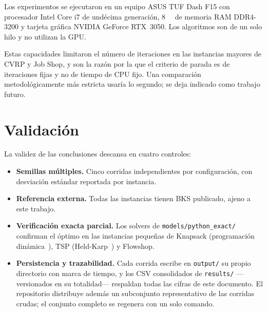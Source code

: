 Los experimentos se ejecutaron en un equipo ASUS TUF Dash F15 con procesador
Intel Core i7 de undécima generación, \SI{8}{\giga\byte} de memoria RAM
DDR4-3200 y tarjeta gráfica NVIDIA GeForce RTX~3050. Los algoritmos son de
un solo hilo y no utilizan la GPU.

Estas capacidades limitaron el número de iteraciones en las instancias
mayores de CVRP y Job Shop, y son la razón por la que el criterio de parada
es de iteraciones fijas y no de tiempo de CPU fijo. Una comparación
metodológicamente más estricta usaría lo segundo; se deja indicado como
trabajo futuro.

\section{Validación}

La validez de las conclusiones descansa en cuatro controles:

\begin{itemize}
  \item \textbf{Semillas múltiples.} Cinco corridas independientes por
    configuración, con desviación estándar reportada por instancia.
  \item \textbf{Referencia externa.} Todas las instancias tienen BKS
    publicado, ajeno a este trabajo.
  \item \textbf{Verificación exacta parcial.} Los solvers de
    \texttt{models/python\_exact/} confirman el óptimo en las instancias
    pequeñas de Knapsack (programación dinámica~\cite{martello1990knapsack}),
    TSP (Held-Karp~\cite{held1962dynamic}) y Flowshop.
  \item \textbf{Persistencia y trazabilidad.} Cada corrida escribe en
    \texttt{output/} su propio directorio con marca de tiempo, y los CSV
    consolidados de \texttt{results/} —versionados en su totalidad— respaldan
    todas las cifras de este documento. El repositorio distribuye además un
    subconjunto representativo de las corridas crudas; el conjunto completo se
    regenera con un solo comando.
\end{itemize}
